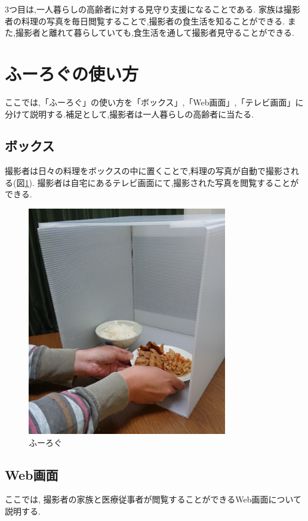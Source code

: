 \documentclass[../report]{subfiles}
\begin{document}
3つ目は,一人暮らしの高齢者に対する見守り支援になることである.
家族は撮影者の料理の写真を毎日閲覧することで,撮影者の食生活を知ることができる.
また,撮影者と離れて暮らしていても,食生活を通して撮影者見守ることができる.

\section{ふーろぐの使い方}
ここでは,「ふーろぐ」の使い方を「ボックス」,「Web画面」,「テレビ画面」に分けて説明する.補足として,撮影者は一人暮らしの高齢者に当たる.

\subsection{ボックス}
撮影者は日々の料理をボックスの中に置くことで,料理の写真が自動で撮影される(図\ref{fig:fl}).
撮影者は自宅にあるテレビ画面にて,撮影された写真を閲覧することができる.
\begin{figure}[htbp]
    \begin{center}
        \includegraphics[height=10cm]{imgs/5_fl.png}
        \caption{ふーろぐ}
        \label{fig:fl}
    \end{center}
\end{figure}

\subsection{Web画面}
ここでは, 撮影者の家族と医療従事者が閲覧することができるWeb画面について説明する.
\end{document}
